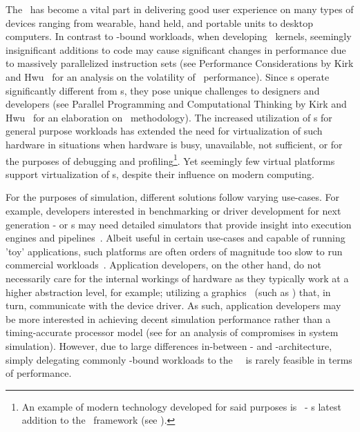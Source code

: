 The \dvttermgpu\ has become a vital part in delivering good user experience on many types of devices ranging from wearable, hand held, and portable units to desktop computers.
In contrast to \dvttermcpu -bound workloads, when developing \dvttermgpu\ kernels, seemingly insignificant additions to code may cause significant changes in performance due to massively parallelized instruction sets (see Performance Considerations by Kirk and Hwu~ for an analysis on the volatility of \dvttermgpu\ performance).
Since \dvttermgpu s operate significantly different from \dvttermcpu s, they pose unique challenges to designers and developers (see Parallel Programming and Computational Thinking by Kirk and Hwu~ for an elaboration on \dvttermgpgpu\ methodology).
The increased utilization of \dvttermgpu s for general purpose workloads has extended the need for virtualization of such hardware in situations when hardware is busy, unavailable, not sufficient, or for the purposes of debugging and profiling\footnote{An example of modern technology developed for said purposes is \dvttermwarp\ - \dvttermmicrosoft s latest addition to the \dvttermdirectx\ framework (see ).}.
Yet seemingly few virtual platforms support virtualization of \dvttermgpu s, despite their influence on modern computing.

For the purposes of simulation, different solutions follow varying use-cases. For example, developers interested in benchmarking or driver development for next generation \dvttermgpu - or \dvttermcpu s may need detailed simulators that provide insight into execution engines and pipelines~.
Albeit useful in certain use-cases and capable of running 'toy' applications, such platforms are often orders of magnitude too slow to run commercial workloads~.
Application developers, on the other hand, do not necessarily care for the internal workings of hardware as they typically work at a higher abstraction level, for example; utilizing a graphics \dvttermapi\ (such as \dvttermopengl ) that, in turn, communicate with the device driver.
As such, application developers may be more interested in achieving decent simulation performance rather than a timing-accurate processor model (see  for an analysis of compromises in system simulation).
However, due to large differences in-between \dvttermcpu - and \dvttermgpu -architecture, simply delegating commonly \dvttermgpu -bound workloads to the \dvttermhost\ \dvttermcpu\ is rarely feasible in terms of performance.


